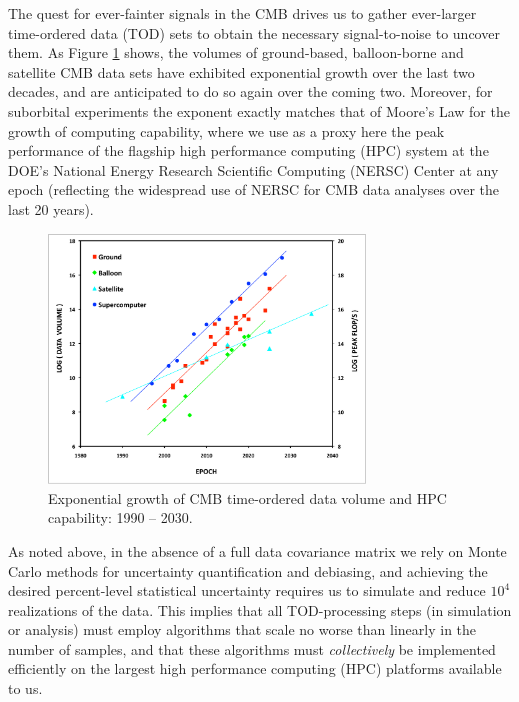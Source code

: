 The quest for ever-fainter signals in the CMB drives us to gather ever-larger time-ordered data (TOD) sets to obtain the necessary signal-to-noise to uncover them. As Figure \ref{fig_cmb_hpc_scaling} shows, the volumes of ground-based, balloon-borne and satellite CMB data sets have exhibited exponential growth over the last two decades, and are anticipated to do so again over the coming two. Moreover, for suborbital experiments the exponent exactly matches that of Moore's Law for the growth of computing capability, where we use as a proxy here the peak performance of the flagship high performance computing (HPC) system at the DOE's National Energy Research Scientific Computing (NERSC) Center at any epoch (reflecting the widespread use of NERSC for CMB data analyses over the last 20 years). 

\begin{figure}[htbp]
\centering
\includegraphics[width=0.75\textwidth]{Analysis/cmb_hpc_scaling}
\caption{Exponential growth of CMB time-ordered data volume and HPC capability: 1990 -- 2030.}
\label{fig_cmb_hpc_scaling}
\end{figure}

As noted above, in the absence of a full data covariance matrix we rely on Monte Carlo methods for uncertainty quantification and debiasing, and achieving the desired percent-level statistical uncertainty requires us to simulate and reduce $10^4$ realizations of the data. This implies that all TOD-processing steps (in simulation or analysis) must employ algorithms that scale no worse than linearly in the number of samples, and that these algorithms must {\em collectively} be implemented efficiently on the largest high performance computing (HPC) platforms available to us. 

